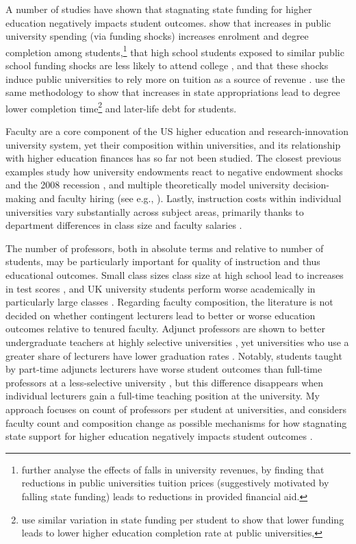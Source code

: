 A number of studies have shown that stagnating state funding for higher education negatively impacts student outcomes.
\cite{NBERw23736} show that increases in public university spending (via funding shocks) increases enrolment and degree completion among students,\footnote{
    \cite{miller2022making} further analyse the effects of falls in university revenues, by finding that reductions in public universities tuition prices (suggestively motivated by falling state funding) leads to reductions in provided financial aid.
}
that high school students exposed to similar public school funding shocks are less likely to attend college \citep{jackson2021school}, and that these shocks induce public universities to rely more on tuition as a source of revenue \citep{bound2019public}.
\cite{NBERw27885} use the same methodology to show that increases in state appropriations lead to degree lower completion time\footnote{
    \cite{bound2007cohort} use similar variation in state funding per student to show that lower funding leads to lower higher education completion rate at public universities, 
} and later-life debt for students.

Faculty are a core component of the US higher education and research-innovation university system, yet their composition within universities, and its relationship with higher education finances has so far not been studied.
The closest previous examples study  how university endowments react to negative endowment shocks \citep{brown2014endowment} and the 2008 recession \citep{turner2014impact}, and multiple theoretically model university decision-making and faculty hiring (see e.g., \citealt{abe2015implications,johnson2009jep,NBERc13879}).
Lastly, instruction costs within individual universities vary substantially across subject areas, primarily thanks to department differences in class size and faculty salaries \citep{hemelt2021math}.

The number of professors, both in absolute terms and relative to number of students, may be particularly important for quality of instruction and thus educational outcomes.
Small class sizes class size at high school lead to increases in test scores \citep{angrist1999using}, and UK university students perform worse academically in particularly large classes \citep{bandiera2010heterogeneous}.
Regarding faculty composition, the literature is not decided on whether contingent lecturers lead to better or worse education outcomes relative to tenured faculty.
Adjunct professors are shown to better undergraduate teachers at highly selective universities \citep{bettinger2010does,figlio2015tenure}, yet universities who use a greater share of lecturers have lower graduation rates \citep{ehrenberg2005tenured}.
Notably, students taught by part-time adjuncts lecturers have worse student outcomes than full-time professors at a less-selective university \citep{zhu2021limited}, but this difference disappears when individual lecturers gain a full-time teaching position at the university. 
My approach focuses on count of professors per student at universities, and considers faculty count and composition change as possible mechanisms for how stagnating state support for higher education negatively impacts student outcomes \citep{NBERw23736,NBERw27885}.
